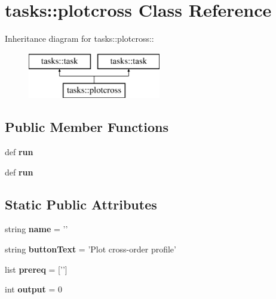 \section{tasks::plotcross Class Reference}
\label{classtasks_1_1plotcross}
Inheritance diagram for tasks::plotcross::\begin{figure}[H]
\begin{center}
\leavevmode
\includegraphics[height=2cm]{classtasks_1_1plotcross}
\end{center}
\end{figure}
\subsection*{Public Member Functions}
\begin{CompactItemize}
\item 
def \textbf{run}\label{classtasks_1_1plotcross_0a8e5cdcfe67c0318ca5c81ad986491c}

\item 
def \textbf{run}\label{classtasks_1_1plotcross_0a8e5cdcfe67c0318ca5c81ad986491c}

\end{CompactItemize}
\subsection*{Static Public Attributes}
\begin{CompactItemize}
\item 
string \textbf{name} = '{\bfplotcross}'\label{classtasks_1_1plotcross_bd7609b129ee55f318dea09cf1977257}

\item 
string \textbf{button\-Text} = 'Plot cross-order profile'\label{classtasks_1_1plotcross_ee5e9fdfa52617ca2fbd39736885b86e}

\item 
list \textbf{prereq} = ['{\bfpreproc}']\label{classtasks_1_1plotcross_467eea84daabfbe4a8772e98a68bb74f}

\item 
int \textbf{output} = 0\label{classtasks_1_1plotcross_830ab0e671403732f95073f3113b7c77}

\end{CompactItemize}


